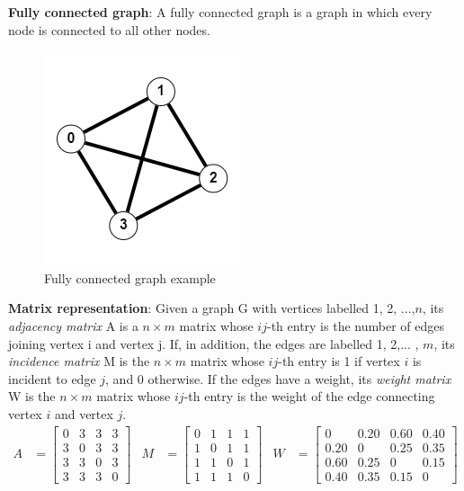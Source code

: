 \documentclass[\main/main.tex]{subfiles}
\begin{document}
\textbf{Fully connected graph}:
A fully connected graph is a graph in which every node is connected to all other nodes. \cite{Siu1998IntroductionTG}
\begin{center}
    \begin{figure}[h]
    \centering
    \includegraphics[scale=1]{images/methods/fully_connected_graph_example.png}
    \caption{Fully connected graph example}
    \label{fig:fully_connected_graph_example}
\end{figure}
\end{center}
\textbf{Matrix representation}: 
Given a graph G with vertices labelled {1, 2, ...,$n$}, its \emph{adjacency matrix} A is a $n \times m$ matrix whose $ij$-th entry is the number of edges joining vertex i and vertex j. If, in addition, the edges are labelled {1, 2,... , $m$}, its \emph{incidence matrix} M is the $n \times m$ matrix whose $ij$-th entry is 1 if vertex $i$ is incident to edge $j$, and 0 otherwise. If the edges have a weight, its \emph{weight matrix} W is the $n \times m$ matrix whose $ij$-th entry is the weight of the edge connecting vertex $i$ and vertex $j$.
\begin{align}
A &= \begin{bmatrix}
    0 & 3 & 3 & 3\\
    3 & 0 & 3 & 3\\
    3 & 3 & 0 & 3\\
    3 & 3 & 3 & 0
\end{bmatrix}
&
M &= \begin{bmatrix}
    0 & 1 & 1 & 1\\
    1 & 0 & 1 & 1\\
    1 & 1 & 0 & 1\\
    1 & 1 & 1 & 0
\end{bmatrix}
&
W &= \begin{bmatrix}
    0 & 0.20 & 0.60 & 0.40\\
    0.20 & 0 & 0.25 & 0.35\\
    0.60 & 0.25 & 0 & 0.15\\
    0.40 & 0.35 & 0.15 & 0
\end{bmatrix}
\end{align}
\end{document}
